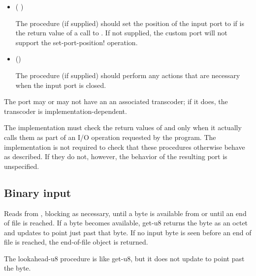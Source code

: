 \begin{entry}{%
}
\begin{itemize}
  The  procedure (if supplied) should return a single
  value.  The return value should represent the current position of
  the input port.  If not supplied, the custom port will not support
  the {\cf port-position} operation.
  
\item {\cf ( )}
       
  The  procedure (if supplied) should set the
  position of the input port to  if  is the return
  value of a call to .  If not supplied, the custom
  port will not support the {\cf set-port-position!} operation.
       
\item {\cf ()}
       
  The  procedure (if supplied) should perform any actions
  that are necessary when the input port is closed.
\end{itemize}

The port may or may not have an an associated transcoder; if it does,
the transcoder is implementation-dependent.

\implresp The implementation must check the return
values of  and  only when it actually calls
them as part of an I/O operation requested by the program.  The
implementation is not required to check that these procedures
otherwise behave as described.  If they do not, however, the behavior
of the resulting port is unspecified.
\end{entry}

\subsection{Binary input}\unsection

\begin{entry}{%
}
   
Reads from , blocking as necessary, until a
byte is available from  or until an end of file is reached.
If a byte becomes available, {\cf get-u8} returns the byte as an octet and
updates  to point just past that byte. If no input
byte is seen before an end of file is reached, the end-of-file
object is returned.
\end{entry}

\begin{entry}{%
}
   
The {\cf lookahead-u8} procedure is like {\cf get-u8}, but it does not 
update  to point past the byte.
\end{entry}

